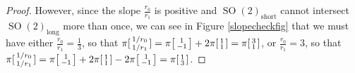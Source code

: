 \documentclass[12pt,a4paper]{amsart}
\theoremstyle{definition}
\DeclareMathOperator{\SOrth}{SO}
\newenvironment{smallbmatrix}
  {\left[\begin{smallmatrix}}
  {\end{smallmatrix}\right]}
\begin{document}
\begin{proof}
However, since the slope $\tfrac{r_0}{r_1}$ is positive and $\SOrth(2)_\text{short}$ cannot intersect $\SOrth(2)_\text{long}$ more than once, we can see in Figure \ref{slopecheckfig} that we must have either $\tfrac{r_0}{r_1}=\tfrac{1}{3}$, so that $\pi[\begin{smallmatrix}1/r_0 \\ 1/r_1\end{smallmatrix}]=\pi\begin{smallbmatrix}1 \\ -1\end{smallbmatrix}+2\pi\begin{smallbmatrix}1 \\ 1\end{smallbmatrix}=\pi\begin{smallbmatrix}3 \\ 1\end{smallbmatrix}$, or $\tfrac{r_0}{r_1}=3$, so that $\pi[\begin{smallmatrix}1/r_0 \\ 1/r_1\end{smallmatrix}]=\pi\begin{smallbmatrix}1 \\ -1\end{smallbmatrix}+2\pi\begin{smallbmatrix}1 \\ 1\end{smallbmatrix}-2\pi\begin{smallbmatrix}1 \\ -1\end{smallbmatrix}=\pi\begin{smallbmatrix}1 \\ 3\end{smallbmatrix}$.\mbox{\qedhere}


\end{proof}
\end{document}
